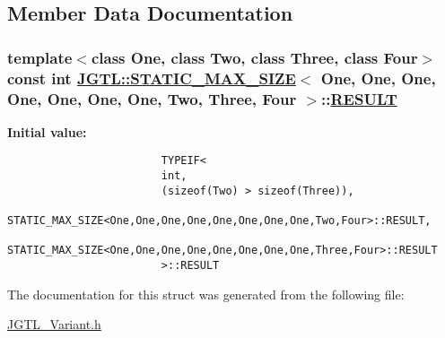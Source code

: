\subsection{Member Data Documentation}
\hypertarget{struct_j_g_t_l_1_1_s_t_a_t_i_c___m_a_x___s_i_z_e_3_01_one_00_01_one_00_01_one_00_01_one_00_01_on1ea2882b2f3315e024773e1becf2883f_462f57f9c16ebe6c225388a01a026a74}{
\subsubsection[RESULT]{\setlength{\rightskip}{0pt plus 5cm}template$<$class One, class Two, class Three, class Four$>$ const int \hyperlink{struct_j_g_t_l_1_1_s_t_a_t_i_c___m_a_x___s_i_z_e}{JGTL::STATIC\_\-MAX\_\-SIZE}$<$ One, One, One, One, One, One, One, Two, Three, Four $>$::\hyperlink{struct_j_g_t_l_1_1_s_t_a_t_i_c___m_a_x___s_i_z_e_3_01_one_00_01_one_00_01_one_00_01_one_00_01_on1ea2882b2f3315e024773e1becf2883f_462f57f9c16ebe6c225388a01a026a74}{RESULT}}}
\label{struct_j_g_t_l_1_1_s_t_a_t_i_c___m_a_x___s_i_z_e_3_01_one_00_01_one_00_01_one_00_01_one_00_01_on1ea2882b2f3315e024773e1becf2883f_462f57f9c16ebe6c225388a01a026a74}


\textbf{Initial value:}

\begin{Code}\begin{verbatim}
                        TYPEIF<
                        int,
                        (sizeof(Two) > sizeof(Three)),
                        STATIC_MAX_SIZE<One,One,One,One,One,One,One,One,Two,Four>::RESULT,
                        STATIC_MAX_SIZE<One,One,One,One,One,One,One,One,Three,Four>::RESULT
                        >::RESULT
\end{verbatim}\end{Code}


The documentation for this struct was generated from the following file:\begin{CompactItemize}
\item 
\hyperlink{_j_g_t_l___variant_8h}{JGTL\_\-Variant.h}\end{CompactItemize}
